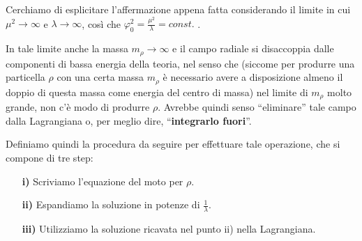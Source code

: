 \documentclass[../main.tex]{subfiles}
\begin{document}
Cerchiamo di esplicitare l'affermazione appena fatta considerando il limite in cui $\mu^2\rightarrow\infty$ e $\lambda\rightarrow\infty$, così che $\varphi_0^2 = \frac{\mu^2}{\lambda} = const.$ .

In tale limite anche la massa $m_\rho\rightarrow \infty$ e il campo radiale si disaccoppia dalle componenti di bassa energia della teoria, nel senso che (siccome per produrre una particella $\rho$ con una certa massa $m_\rho$ è necessario avere a disposizione almeno il doppio di questa massa come energia del centro di massa) nel limite di $m_\rho$ molto grande, non c'è modo di produrre $\rho$. Avrebbe quindi senso “eliminare” tale campo dalla Lagrangiana o, per meglio dire, “\textbf{integrarlo fuori}”.

Definiamo quindi la procedura da seguire per effettuare tale operazione, che si compone di tre step:
\begin{enumerate}
    \item[\textbf{i)}] Scriviamo l'equazione del moto per $\rho$.
    \item[\textbf{ii)}] Espandiamo la soluzione in potenze di $\frac{1}{\lambda}$.
    \item[\textbf{iii)}] Utilizziamo la soluzione ricavata nel punto ii) nella Lagrangiana.
\end{enumerate}
\end{document}
